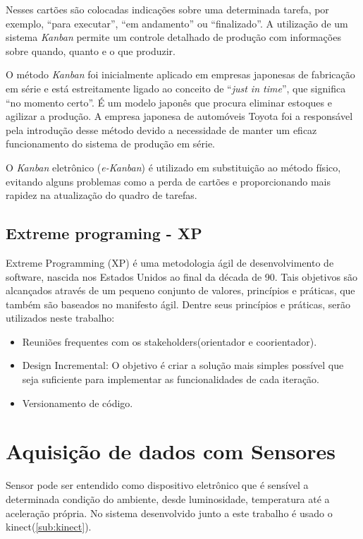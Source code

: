 Nesses cartões são colocadas indicações sobre uma determinada tarefa, por exemplo, “para executar”, “em andamento” ou “finalizado”.
A utilização de um sistema \textit{Kanban} permite um controle detalhado de produção com informações sobre quando, quanto e o que produzir.

O método \textit{Kanban} foi inicialmente aplicado em empresas japonesas de fabricação em série e está estreitamente ligado ao conceito de “\textit{just in time}”, que significa “no momento certo”. É um modelo japonês que procura eliminar estoques e agilizar a produção.
A empresa japonesa de automóveis Toyota foi a responsável pela introdução desse método devido a necessidade de manter um eficaz funcionamento do sistema de produção em série.

O \textit{Kanban} eletrônico (\textit{e-Kanban}) é utilizado em substituição ao método físico, evitando alguns problemas como a perda de cartões e proporcionando mais rapidez na atualização do quadro de tarefas.\cite{kanban}



\subsection{Extreme programing - XP}
\label{sec:xp}
Extreme Programming (XP) é uma metodologia ágil de desenvolvimento de software,
nascida nos Estados Unidos ao final da década de 90. Tais objetivos são
alcançados através de um pequeno conjunto de valores, princípios
 e práticas, que também são baseados no manifesto ágil. Dentre seus princípios
e práticas, serão utilizados neste trabalho:

  \begin{itemize}
  \item Reuniões frequentes com os stakeholders(orientador e coorientador).
  \item Design Incremental: O objetivo é criar a solução mais simples possível
  que seja suficiente para implementar as funcionalidades de cada iteração.
  \cite{praticaXp}
  \item Versionamento de código.
  \cite{praticaXp}
  \end{itemize}

  \section{Aquisição de dados com Sensores}
  \label{sec:aquisicaoSensores}

    Sensor pode ser entendido como dispositivo eletrônico que é sensível a determinada
  condição do ambiente, desde luminosidade, temperatura até a aceleração própria.
  No sistema desenvolvido junto a este trabalho é usado o kinect(\ref{sub:kinect}).


